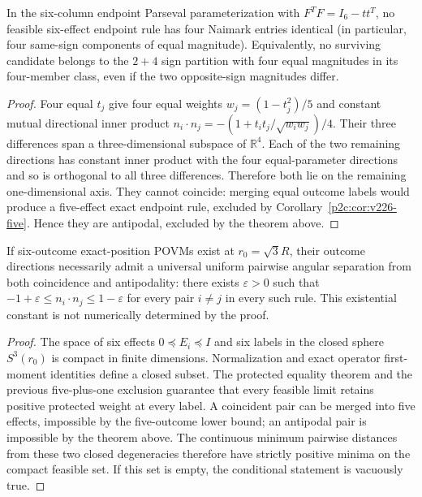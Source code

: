 \documentclass[12pt,a4paper]{article}
\begin{document}
\begin{corollary}
\label{p2c:cor:gc20-fourfold-no-go}
In the six-column endpoint Parseval parameterization with
$F^TF=I_6-tt^T$, no feasible six-effect endpoint rule has four
Naimark entries identical (in particular, four same-sign components
of equal magnitude). Equivalently, no surviving candidate belongs
to the $2+4$ sign partition with four equal magnitudes in its
four-member class, even if the two opposite-sign magnitudes differ.
\end{corollary}
\begin{proof}
Four equal $t_j$ give four equal weights
$w_j=(1-t_j^2)/5$ and constant mutual directional inner product
$n_i\cdot n_j=-(1+t_i t_j/\sqrt{w_iw_j})/4$.
Their three differences span a three-dimensional subspace of
$\mathbb R^4$. Each of the two remaining directions has constant
inner product with the four equal-parameter directions and so is
orthogonal to all three differences. Therefore both lie on the
remaining one-dimensional axis. They cannot coincide: merging equal
outcome labels would produce a five-effect exact endpoint rule,
excluded by Corollary~\ref{p2c:cor:v226-five}. Hence they are
antipodal, excluded by the theorem above.
\end{proof}

\begin{corollary}
\label{p2c:cor:gc20-angular-gap}
If six-outcome exact-position POVMs exist at $r_0=\sqrt3R$, their
outcome directions necessarily admit a universal uniform pairwise
angular separation from both coincidence and antipodality: there
exists $\varepsilon>0$ such that
$-1+\varepsilon\le n_i\cdot n_j\le1-\varepsilon$ for every
pair $i\ne j$ in every such rule.
This existential constant is not numerically determined by the proof.
\end{corollary}
\begin{proof}
The space of six effects $0\preceq E_i\preceq I$ and six labels in
the closed sphere $S^3(r_0)$ is compact in finite dimensions.
Normalization and exact operator first-moment identities define a
closed subset. The protected equality theorem and the previous
five-plus-one exclusion guarantee that every feasible limit retains
positive protected weight at every label. A coincident pair can be
merged into five effects, impossible by the five-outcome lower bound;
an antipodal pair is impossible by the theorem above. The continuous
minimum pairwise distances from these two closed degeneracies therefore
have strictly positive minima on the compact feasible set. If this
set is empty, the conditional statement is vacuously true.
\end{proof}
\end{document}
